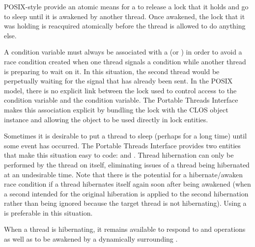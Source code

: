 \documentclass[10pt,twoside,english,pdftex]{article}
\begin{document}

POSIX-style  provide an atomic means for a
 to release a lock that it holds and go to sleep until it is
awakened by another thread.  Once awakened, the lock that it was holding is
reacquired atomically before the thread is allowed to do anything else.

A condition variable must always be associated with a  (or
) in order to avoid a race condition created when one
thread signals a condition while another thread is preparing to wait on it.
In this situation, the second thread would be perpetually waiting for the
signal that has already been sent.  In the POSIX model, there is no explicit
link between the lock used to control access to the condition variable and the
condition variable.  The Portable Threads Interface makes this association
explicit by bundling the lock with the
 CLOS object instance and allowing
the  object to be used directly in
lock entities.


Sometimes it is desirable to put a thread to sleep (perhaps for a long time) until some event has occurred.  The Portable Threads Interface provides two entities that make this situation easy to code:  and .  Thread hibernation can only be performed by the thread on itself, eliminating issues of a thread being hibernated at an undesirable time.  Note that there is the potential for a hibernate/awaken race condition if a thread hibernates itself again soon after being awakened (when a second  intended for the original hiberation is applied to the second hibernation rather than being ignored because the target thread is not hibernating).  Using a  is preferable in this situation.

When a thread is hibernating, it remains available to respond to  and  operations as well as to be awakened by a dynamically surrounding .

\end{document}
